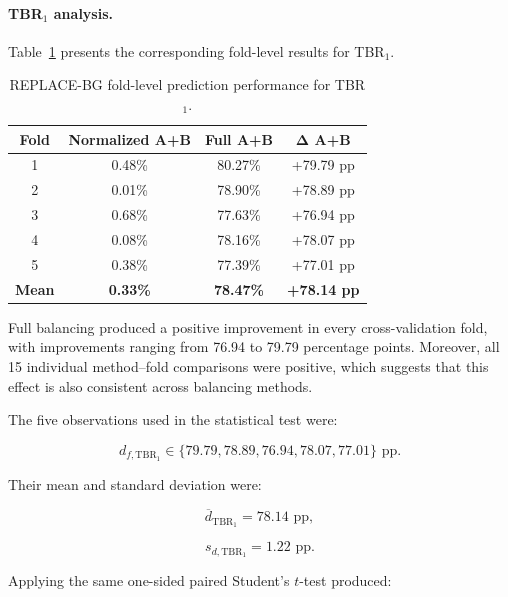 \paragraph{TBR$_1$ analysis.}

Table~\ref{tab:replacebg_fold_tbr1_effect} presents the corresponding fold-level results for TBR$_1$.

\begin{table}[htbp]
\centering
\caption{REPLACE-BG fold-level prediction performance for TBR$_1$.}
\label{tab:replacebg_fold_tbr1_effect}
\begin{tabular}{cccc}
\toprule
\textbf{Fold}
& \textbf{Normalized A+B}
& \textbf{Full A+B}
& $\boldsymbol{\Delta}$ \textbf{A+B} \\
\midrule
1 & 0.48\% & 80.27\% & +79.79 pp \\
2 & 0.01\% & 78.90\% & +78.89 pp \\
3 & 0.68\% & 77.63\% & +76.94 pp \\
4 & 0.08\% & 78.16\% & +78.07 pp \\
5 & 0.38\% & 77.39\% & +77.01 pp \\
\midrule
\textbf{Mean}
& \textbf{0.33\%}
& \textbf{78.47\%}
& \textbf{+78.14 pp} \\
\bottomrule
\end{tabular}
\end{table}

Full balancing produced a positive improvement in every cross-validation fold, with improvements ranging from 76.94 to 79.79 percentage points. Moreover, all 15 individual method--fold comparisons were positive, which suggests that this effect is also consistent across balancing methods.

The five observations used in the statistical test were:

\begin{equation}
d_{f,\mathrm{TBR_1}}
\in
\{
79.79,
78.89,
76.94,
78.07,
77.01
\}
\text{ pp}.
\end{equation}

Their mean and standard deviation were:

\begin{equation}
\overline{d}_{\mathrm{TBR_1}}
=
78.14
\text{ pp},
\end{equation}

\begin{equation}
s_{d,\mathrm{TBR_1}}
=
1.22
\text{ pp}.
\end{equation}

Applying the same one-sided paired Student's $t$-test produced:

